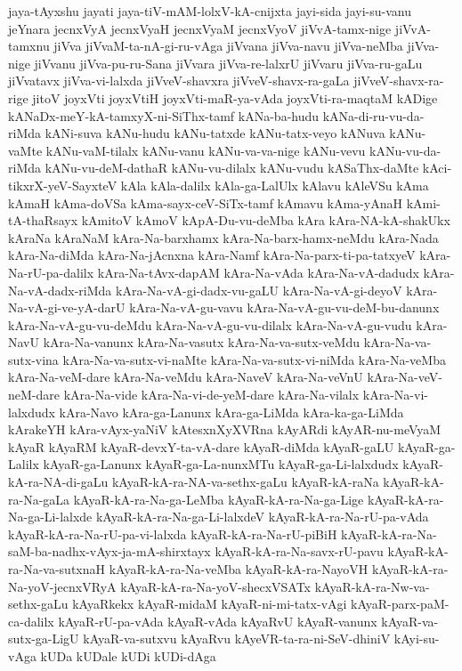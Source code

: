 {jaya-tAyxshu
jayati
jaya-tiV-mAM-lolxV-kA-cnijxta
jayi-sida
jayi-su-vanu
jeYnara
jecnxVyA
jecnxVyaH
jecnxVyaM
jecnxVyoV
jiVvA-tamx-nige
jiVvA-tamxnu
jiVva
jiVvaM-ta-nA-gi-ru-vAga
jiVvana
jiVva-navu
jiVva-neMba
jiVva-nige
jiVvanu
jiVva-pu-ru-Sana
jiVvara
jiVva-re-lalxrU
jiVvaru
jiVva-ru-gaLu
jiVvatavx
jiVva-vi-lalxda
jiVveV-shavxra
jiVveV-shavx-ra-gaLa
jiVveV-shavx-ra-rige
jitoV
joyxVti
joyxVtiH
joyxVti-maR-ya-vAda
joyxVti-ra-maqtaM
kADige
kANaDx-meY-kA-tamxyX-ni-SiThx-tamf
kANa-ba-hudu
kANa-di-ru-vu-da-riMda
kANi-suva
kANu-hudu
kANu-tatxde
kANu-tatx-veyo
kANuva
kANu-vaMte
kANu-vaM-tilalx
kANu-vanu
kANu-va-va-nige
kANu-vevu
kANu-vu-da-riMda
kANu-vu-deM-dathaR
kANu-vu-dilalx
kANu-vudu
kASaThx-daMte
kAci-tikxrX-yeV-SayxteV
kAla
kAla-dalilx
kAla-ga-LalUlx
kAlavu
kAleVSu
kAma
kAmaH
kAma-doVSa
kAma-sayx-ceV-SiTx-tamf
kAmavu
kAma-yAnaH
kAmi-tA-thaRsayx
kAmitoV
kAmoV
kApA-Du-vu-deMba
kAra
kAra-NA-kA-shakUkx
kAraNa
kAraNaM
kAra-Na-barxhamx
kAra-Na-barx-hamx-neMdu
kAra-Nada
kAra-Na-diMda
kAra-Na-jAcnxna
kAra-Namf
kAra-Na-parx-ti-pa-tatxyeV
kAra-Na-rU-pa-dalilx
kAra-Na-tAvx-dapAM
kAra-Na-vAda
kAra-Na-vA-dadudx
kAra-Na-vA-dadx-riMda
kAra-Na-vA-gi-dadx-vu-gaLU
kAra-Na-vA-gi-deyoV
kAra-Na-vA-gi-ve-yA-darU
kAra-Na-vA-gu-vavu
kAra-Na-vA-gu-vu-deM-bu-danunx
kAra-Na-vA-gu-vu-deMdu
kAra-Na-vA-gu-vu-dilalx
kAra-Na-vA-gu-vudu
kAra-NavU
kAra-Na-vanunx
kAra-Na-vasutx
kAra-Na-va-sutx-veMdu
kAra-Na-va-sutx-vina
kAra-Na-va-sutx-vi-naMte
kAra-Na-va-sutx-vi-niMda
kAra-Na-veMba
kAra-Na-veM-dare
kAra-Na-veMdu
kAra-NaveV
kAra-Na-veVnU
kAra-Na-veV-neM-dare
kAra-Na-vide
kAra-Na-vi-de-yeM-dare
kAra-Na-vilalx
kAra-Na-vi-lalxdudx
kAra-Navo
kAra-ga-Lanunx
kAra-ga-LiMda
kAra-ka-ga-LiMda
kArakeYH
kAra-vAyx-yaNiV
kAtesxnXyXVRna
kAyARdi
kAyAR-nu-meVyaM
kAyaR
kAyaRM
kAyaR-devxY-ta-vA-dare
kAyaR-diMda
kAyaR-gaLU
kAyaR-ga-Lalilx
kAyaR-ga-Lanunx
kAyaR-ga-La-nunxMTu
kAyaR-ga-Li-lalxdudx
kAyaR-kA-ra-NA-di-gaLu
kAyaR-kA-ra-NA-va-sethx-gaLu
kAyaR-kA-raNa
kAyaR-kA-ra-Na-gaLa
kAyaR-kA-ra-Na-ga-LeMba
kAyaR-kA-ra-Na-ga-Lige
kAyaR-kA-ra-Na-ga-Li-lalxde
kAyaR-kA-ra-Na-ga-Li-lalxdeV
kAyaR-kA-ra-Na-rU-pa-vAda
kAyaR-kA-ra-Na-rU-pa-vi-lalxda
kAyaR-kA-ra-Na-rU-piBiH
kAyaR-kA-ra-Na-saM-ba-nadhx-vAyx-ja-mA-shirxtayx
kAyaR-kA-ra-Na-savx-rU-pavu
kAyaR-kA-ra-Na-va-sutxnaH
kAyaR-kA-ra-Na-veMba
kAyaR-kA-ra-NayoVH
kAyaR-kA-ra-Na-yoV-jecnxVRyA
kAyaR-kA-ra-Na-yoV-shecxVSATx
kAyaR-kA-ra-Nw-va-sethx-gaLu
kAyaRkekx
kAyaR-midaM
kAyaR-ni-mi-tatx-vAgi
kAyaR-parx-paM-ca-dalilx
kAyaR-rU-pa-vAda
kAyaR-vAda
kAyaRvU
kAyaR-vanunx
kAyaR-va-sutx-ga-LigU
kAyaR-va-sutxvu
kAyaRvu
kAyeVR-ta-ra-ni-SeV-dhiniV
kAyi-su-vAga
kUDa
kUDale
kUDi
kUDi-dAga
}
